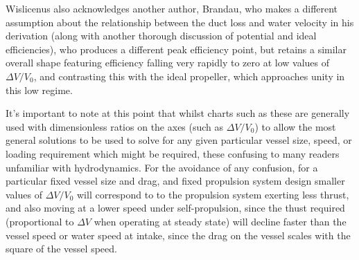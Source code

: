 \documentclass{article}\usepackage[]{graphicx}\usepackage[]{color}
\begin{document}
Wislicenus also acknowledges \cite{wislicenus1973} another author, Brandau, who makes a different assumption about the relationship between the duct loss and water velocity \parencite{brandau1967} in his derivation (along with another thorough discussion of potential and ideal efficiencies), who produces a different peak efficiency point, but retains a similar overall shape featuring efficiency falling very rapidly to zero at low values of $\Delta V / V_0$, and contrasting this with the ideal propeller, which approaches unity in this low regime.

It's important to note at this point that whilst charts such as these are generally used with dimensionless ratios on the axes (such as $\Delta V / V_0$) to allow the most general solutions to be used to solve for any given particular vessel size, speed, or loading requirement which might be required, these  confusing to many readers unfamiliar with hydrodynamics.  For the avoidance of any confusion, for a particular fixed vessel size and drag, and fixed propulsion system design smaller values of $\Delta V / V_0$ will correspond to to the propulsion system exerting less thrust, and also moving at a lower speed under self-propulsion, since the thust required (proportional to $\Delta V$ when operating at steady state) will decline faster than the vessel speed or water speed at intake, since the drag on the vessel scales with the square of the vessel speed.
\end{document}
